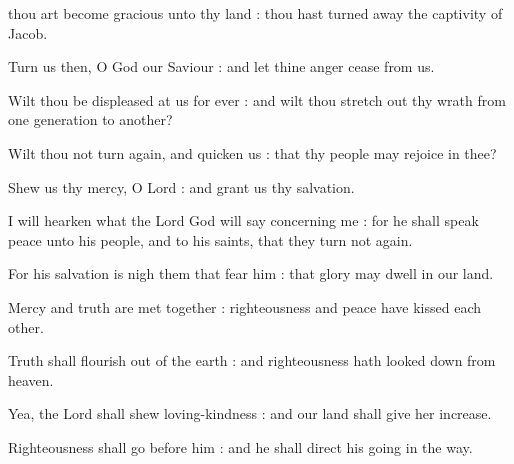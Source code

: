  thou art become gracious unto thy land : thou hast turned away the captivity of Jacob.\par
{}
Turn us then, O God our Saviour : and let thine anger cease from us.\par
{}Wilt thou be displeased at us for ever : and wilt thou stretch out thy wrath from one generation to another?\par
{}Wilt thou not turn again, and quicken us : that thy people may rejoice in thee?\par
{}Shew us thy mercy, O Lord : and grant us thy salvation.\par
{}I will hearken what the Lord God will say concerning me : for he shall speak peace unto his people, and to his saints, that they turn not again.\par
{}For his salvation is nigh them that fear him : that glory may dwell in our land.\par
{}Mercy and truth are met together : righteousness and peace have kissed each other.\par
{}Truth shall flourish out of the earth : and righteousness hath looked down from heaven.\par
{}Yea, the Lord shall shew loving-kindness : and our land shall give her increase.\par
{}Righteousness shall go before him : and he shall direct his going in the way.\par



